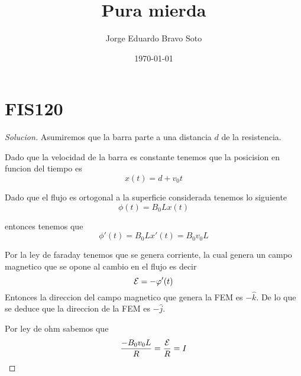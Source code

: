 \documentclass{article}
\title{Pura mierda}
\author{Jorge Eduardo Bravo Soto}
\date{\today}
\theoremstyle{definition}
\newenvironment{solution}{\begin{proof}[Solucion]}{\end{proof}}
\begin{document}
\maketitle
\tableofcontents

\section{FIS120}
\begin{solution}
Asumiremos que la barra parte a una distancia $d$ de la resistencia.

Dado que la velocidad de la barra es constante tenemos que la posicision en funcion del tiempo
es
\begin{equation*}
  x(t) = d + v_{0}t
\end{equation*}

Dado que el flujo es ortogonal a la superficie considerada tenemos lo siguiente
\begin{equation*}
\phi(t) = B_{0}Lx(t)
\end{equation*}

entonces tenemos que
\begin{equation*}
  \phi'(t) = B_{0}Lx'(t) = B_{0}v_{0}L
\end{equation*}

Por la ley de faraday tenemos que se genera corriente, la cual genera un campo magnetico que se opone al cambio en el flujo es decir
\begin{equation*}
  \mathcal{E} = -\varphi'(t)
\end{equation*}
Entonces la direccion del campo magnetico que genera la FEM es $-\hat{k}$.
De lo que se deduce que la direccion de la FEM es $-\hat{j}$.

Por ley de ohm sabemos que
\begin{equation*}
\frac{-B_{0}v_{0}L}{R} = \frac{\mathcal{E}}{R} = I
\end{equation*}
\end{solution}
\end{document}
